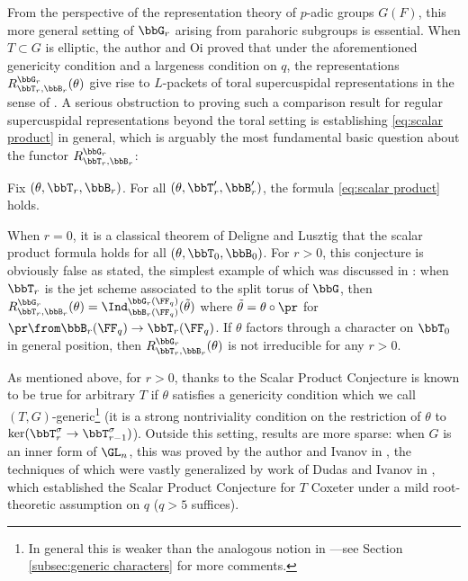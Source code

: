 From the perspective of the representation theory of $p$-adic groups $G(F)$, this more general setting of $\bbG_r$ arising from parahoric subgroups is essential. When $T \subset G$ is elliptic, the author and Oi \cite{CO21} proved that under the aforementioned genericity condition and a largeness condition on $q$, the representations $R_{\bbT_r,\bbB_r}^{\bbG_r}(\theta)$ give rise to $L$-packets of toral supercuspidal representations in the sense of \cite{Ree08,DS18}. A serious obstruction to proving such a comparison result for regular supercuspidal representations \cite{Kal19} beyond the toral setting is establishing \eqref{eq:scalar product} in general, which is arguably the most fundamental basic question about the functor $R_{\bbT_r,\bbB_r}^{\bbG_r}$:

\begin{scalarconjecture*}
  Fix $(\theta,\bbT_r, \bbB_r)$. For all $(\theta,\bbT_r', \bbB_r')$, the formula \eqref{eq:scalar product} holds.
\end{scalarconjecture*}

When $r = 0$, it is a classical theorem of Deligne and Lusztig \cite{DL76} that the scalar product formula holds for all $(\theta,\bbT_0, \bbB_0)$. For $r>0$, this conjecture is obviously false as stated, the simplest example of which was discussed in \cite{CI21-RT}: when $\bbT_r$ is the jet scheme associated to the split torus of $\bbG$, then $R_{\bbT_r,\bbB_r}^{\bbG_r}(\theta) = \Ind_{\bbB_r(\FF_q)}^{\bbG_r(\FF_q)}(\tilde \theta)$ where $\tilde \theta = \theta \circ \pr$ for $\pr \from \bbB_r(\FF_q) \to \bbT_r(\FF_q)$. If $\theta$ factors through a character on $\bbT_0$ in general position, then $R_{\bbT_r,\bbB_r}^{\bbG_r}(\theta)$ is not irreducible for any $r > 0$.

As mentioned above, for $r>0$, thanks to \cite{Lus04,Sta09,CI21-RT} the Scalar Product Conjecture is known to be true for arbitrary $T$ if $\theta$ satisfies a genericity condition which we call $(T,G)$-generic\footnote{In general this is weaker than the analogous notion in \cite{Yu01}---see Section \ref{subsec:generic characters} for more comments.} (it is a strong nontriviality condition on the restriction of $\theta$ to $\ker(\bbT_r^\sigma \to \bbT_{r-1}^\sigma)$). Outside this setting, results are more sparse: when $G$ is an inner form of $\GL_n$, this was proved by the author and Ivanov in \cite{CI_loopGLn}, the techniques of which were vastly generalized by work of Dudas and Ivanov in \cite{DI20}, which established the Scalar Product Conjecture for $T$ Coxeter under a mild root-theoretic assumption on $q$ ($q > 5$ suffices).

